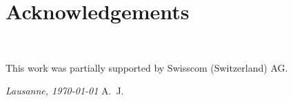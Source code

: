 \chapter*{Acknowledgements}
~\newline~\newline~
This work was partially supported by Swisscom (Switzerland) AG.
\bigskip
 
\noindent\textit{Lausanne, \today}
\hfill A.~J.

